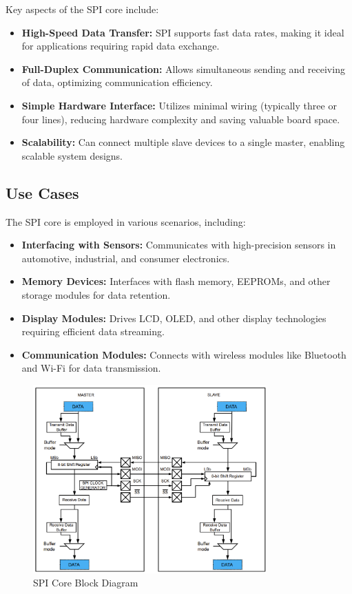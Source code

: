 \documentclass{article}
\begin{document}
Key aspects of the SPI core include:
\begin{itemize}
    \item \textbf{High-Speed Data Transfer:} SPI supports fast data rates, making it ideal for applications requiring rapid data exchange.
    \item \textbf{Full-Duplex Communication:} Allows simultaneous sending and receiving of data, optimizing communication efficiency.
    \item \textbf{Simple Hardware Interface:} Utilizes minimal wiring (typically three or four lines), reducing hardware complexity and saving valuable board space.
    \item \textbf{Scalability:} Can connect multiple slave devices to a single master, enabling scalable system designs.
\end{itemize}

\subsection{Use Cases}
The SPI core is employed in various scenarios, including:
\begin{itemize}
    \item \textbf{Interfacing with Sensors:} Communicates with high-precision sensors in automotive, industrial, and consumer electronics.
    \item \textbf{Memory Devices:} Interfaces with flash memory, EEPROMs, and other storage modules for data retention.
    \item \textbf{Display Modules:} Drives LCD, OLED, and other display technologies requiring efficient data streaming.
    \item \textbf{Communication Modules:} Connects with wireless modules like Bluetooth and Wi-Fi for data transmission.
\end{itemize}

\begin{figure}[H]
    \centering
    \includegraphics[width=0.8\textwidth]{images/spi_block_diagram.png}
    \caption{SPI Core Block Diagram}
    \label{fig:spi_block_diagram}
\end{figure}
\end{document}
